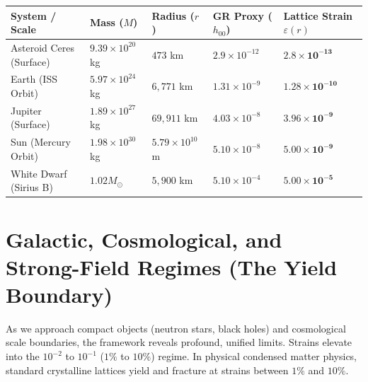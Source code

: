 \documentclass[11pt, letterpaper, openany]{book}
\begin{document}
\begin{center}
\renewcommand{\arraystretch}{1.2}
\small
\begin{tabular}{|p{3.5cm}|p{2cm}|p{2.5cm}|p{2.2cm}|p{2.5cm}|}
\hline
\rowcolor{kishblue!12}
\textbf{System / Scale} & \textbf{Mass ($M$)} & \textbf{Radius ($r$)} & \textbf{GR Proxy ($h_{00}$)} & \textbf{Lattice Strain $\varepsilon(r)$} \\
\hline
Asteroid Ceres (Surface) & $9.39 \times 10^{20}$ kg & $473$ km & $2.9 \times 10^{-12}$ & $\mathbf{2.8 \times 10^{-13}}$ \\
\hline
Earth (ISS Orbit) & $5.97 \times 10^{24}$ kg & $6,771$ km & $1.31 \times 10^{-9}$ & $\mathbf{1.28 \times 10^{-10}}$ \\
\hline
Jupiter (Surface) & $1.89 \times 10^{27}$ kg & $69,911$ km & $4.03 \times 10^{-8}$ & $\mathbf{3.96 \times 10^{-9}}$ \\
\hline
Sun (Mercury Orbit) & $1.98 \times 10^{30}$ kg & $5.79 \times 10^{10}$ m & $5.10 \times 10^{-8}$ & $\mathbf{5.00 \times 10^{-9}}$ \\
\hline
White Dwarf (Sirius B) & $1.02 M_\odot$ & $5,900$ km & $5.10 \times 10^{-4}$ & $\mathbf{5.00 \times 10^{-5}}$ \\
\hline
\end{tabular}
\end{center}

\section{Galactic, Cosmological, and Strong-Field Regimes (The Yield Boundary)}

As we approach compact objects (neutron stars, black holes) and cosmological scale boundaries, the framework reveals profound, unified limits. Strains elevate into the $10^{-2}$ to $10^{-1}$ ($1\%$ to $10\%$) regime. In physical condensed matter physics, standard crystalline lattices yield and fracture at strains between $1\%$ and $10\%$.
\end{document}
